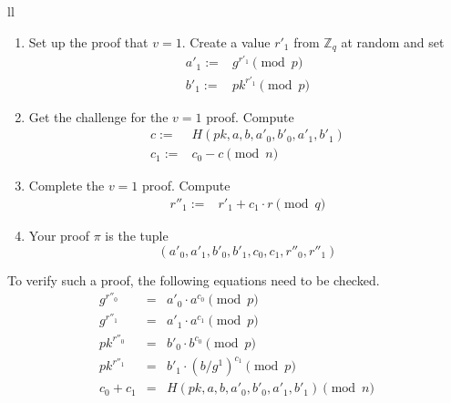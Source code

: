 \documentclass[envcountsame]{llncs}
\begin{document}
\begin{center}
\begin{tabular}{ll}
\begin{minipage}{0.45\textwidth}
\begin{enumerate}
\item Set up the proof that $v = 1$.
Create a value $r'_1$ from $\mathbb Z_q$ at random and set
\[ \begin{array}{rl}
a'_1 := & g^{r'_1} \pmod{p} \\
b'_1 := & pk^{r'_1} \pmod{p}
\end{array} \]

\item Get the challenge for the $v = 1$ proof.
Compute
\[ \begin{array}{rl}
c := & H(pk, a, b, a'_0, b'_0, a'_1, b'_1) \\
c_1 := & c_0 - c \pmod{n}
\end{array} \]

\item Complete the $v = 1$ proof.
Compute
\[ \begin{array}{rl}
r''_1 := & r'_1 + c_1 \cdot r \pmod{q}
\end{array} \]

\item Your proof $\pi$ is the tuple
\[
(a'_0, a'_1, b'_0, b'_1, c_0, c_1, r''_0, r''_1)
\]
\end{enumerate}
\end{minipage}
\end{tabular}
\end{center}

To verify such a proof, the following equations need to be checked.
\begin{eqnarray}
g^{r''_0} & = & a'_0 \cdot a^{c_0} \pmod{p} \\
g^{r''_1} & = & a'_1 \cdot a^{c_1} \pmod{p} \\
pk^{r''_0} & = & b'_0 \cdot b^{c_0} \pmod{p} \\
pk^{r''_1} & = & b'_1 \cdot (b/g^1)^{c_1} \pmod{p} \\
c_0 + c_1 & = & H(pk, a, b, a'_0, b'_0, a'_1, b'_1) \pmod{n}
\end{eqnarray}
\end{document}

